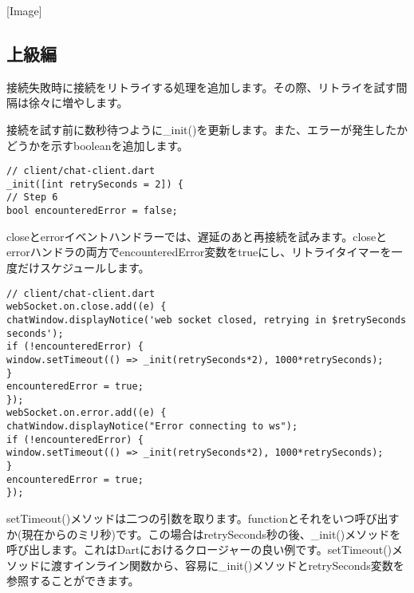 [Image]

\subsection{上級編}

接続失敗時に接続をリトライする処理を追加します。その際、リトライを試す間隔は徐々に増やします。

接続を試す前に数秒待つように\_init()を更新します。また、エラーが発生したかどうかを示すbooleanを追加します。

\begin{verbatim}
// client/chat-client.dart
_init([int retrySeconds = 2]) {
// Step 6
bool encounteredError = false;
\end{verbatim}

closeとerrorイベントハンドラーでは、遅延のあと再接続を試みます。closeとerrorハンドラの両方でencounteredError変数をtrueにし、リトライタイマーを一度だけスケジュールします。

\begin{verbatim}
// client/chat-client.dart
webSocket.on.close.add((e) {
chatWindow.displayNotice('web socket closed, retrying in $retrySeconds
seconds');
if (!encounteredError) {
window.setTimeout(() => _init(retrySeconds*2), 1000*retrySeconds);
}
encounteredError = true;
});
webSocket.on.error.add((e) {
chatWindow.displayNotice("Error connecting to ws");
if (!encounteredError) {
window.setTimeout(() => _init(retrySeconds*2), 1000*retrySeconds);
}
encounteredError = true;
});
\end{verbatim}

setTimeout()メソッドは二つの引数を取ります。functionとそれをいつ呼び出すか(現在からのミリ秒)です。この場合はretrySeconds秒の後、\_init()メソッドを呼び出します。これはDartにおけるクロージャーの良い例です。setTimeout()メソッドに渡すインライン関数から、容易に\_init()メソッドとretrySeconds変数を参照することができます。

